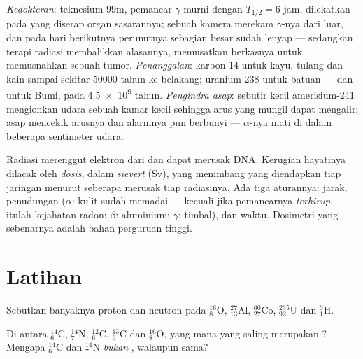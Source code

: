 \begin{example}\label{ex:g11:nucleus-radioactivity:uses}
\emph{Kedokteran}: teknesium-99m, pemancar $\gamma$ murni dengan
$T_{1/2} = 6$ jam, dilekatkan pada  yang diserap organ sasarannya;
sebuah kamera merekam $\gamma$-nya dari luar, dan pada hari berikutnya
perunutnya sebagian besar sudah lenyap --- sedangkan terapi radiasi
membalikkan alasannya, memusatkan berkasnya untuk memusnahkan sebuah tumor.
\emph{Penanggalan}: karbon-14 untuk kayu, tulang dan kain sampai sekitar
\num{50000} tahun ke belakang; uranium-238 untuk batuan --- dan untuk Bumi,
pada \num{4.5e9} tahun. \emph{Pengindra asap}: sebutir kecil amerisium-241
mengionkan udara sebuah kamar kecil sehingga arus yang mungil dapat
mengalir; asap mencekik arusnya dan alarmnya pun berbunyi --- $\alpha$-nya
mati di dalam beberapa sentimeter udara.
\end{example}

\begin{remark}\label{rem:g11:nucleus-radioactivity:dose}
Radiasi merenggut elektron dari  dan dapat merusak DNA. Kerugian
hayatinya dilacak oleh \emph{dosis}, dalam
\emph{sievert} (\unit{Sv}), yang menimbang  yang
diendapkan tiap  jaringan menurut seberapa merusak tiap radiasinya.
Ada tiga aturannya: jarak, penudungan ($\alpha$: kulit sudah memadai ---
kecuali jika pemancarnya \emph{terhirup}, itulah kejahatan radon; $\beta$:
aluminium; $\gamma$: timbal), dan waktu. Dosimetri yang sebenarnya adalah
bahan perguruan tinggi.
\end{remark}

\section{Latihan}

\begin{exercise}[$\star$]\label{exo:g11:nucleus-radioactivity:1}
Sebutkan banyaknya proton dan neutron pada ${}^{16}_{8}\mathrm{O}$,
${}^{27}_{13}\mathrm{Al}$, ${}^{60}_{27}\mathrm{Co}$,
${}^{235}_{92}\mathrm{U}$ dan ${}^{3}_{1}\mathrm{H}$.
\end{exercise}

\begin{exercise}[$\star$]\label{exo:g11:nucleus-radioactivity:2}
Di antara ${}^{14}_{6}\mathrm{C}$, ${}^{14}_{7}\mathrm{N}$,
${}^{12}_{6}\mathrm{C}$, ${}^{13}_{6}\mathrm{C}$ dan
${}^{16}_{8}\mathrm{O}$, yang mana yang saling merupakan ? Mengapa
${}^{14}_{6}\mathrm{C}$ dan ${}^{14}_{7}\mathrm{N}$ \emph{bukan} ,
walaupun  sama?
\end{exercise}

